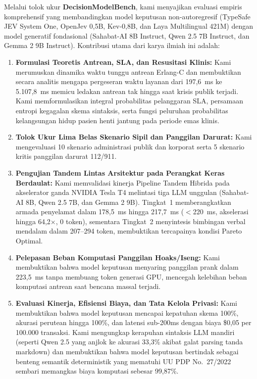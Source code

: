 \documentclass[journal,compsoc]{IEEEtran}
\begin{document}
Melalui tolok ukur \textbf{DecisionModelBench}, kami menyajikan evaluasi empiris komprehensif yang membandingkan model keputusan non-autoregresif (TypeSafe JEV System One, OpenJev 0,5B, Kev-0,8B, dan Laya Multilingual 421M) dengan model generatif fondasional (Sahabat-AI 8B Instruct, Qwen 2.5 7B Instruct, dan Gemma 2 9B Instruct). Kontribusi utama dari karya ilmiah ini adalah:
\begin{enumerate}
    \item \textbf{Formulasi Teoretis Antrean, SLA, dan Resusitasi Klinis:} Kami merumuskan dinamika waktu tunggu antrean Erlang-C dan membuktikan secara analitis mengapa pergeseran waktu layanan dari 197,6~ms ke 5.107,8~ms memicu ledakan antrean tak hingga saat krisis publik terjadi. Kami memformulasikan integral probabilitas pelanggaran SLA, persamaan entropi kegagalan skema sintaksis, serta fungsi peluruhan probabilitas kelangsungan hidup pasien henti jantung pada periode emas klinis.
    \item \textbf{Tolok Ukur Lima Belas Skenario Sipil dan Panggilan Darurat:} Kami mengevaluasi 10 skenario administrasi publik dan korporat serta 5 skenario kritis panggilan darurat 112/911.
    \item \textbf{Pengujian Tandem Lintas Arsitektur pada Perangkat Keras Berdaulat:} Kami memvalidasi kinerja Pipeline Tandem Hibrida pada akselerator ganda NVIDIA Tesla T4 melintasi tiga LLM unggulan (Sahabat-AI 8B, Qwen 2.5 7B, dan Gemma 2 9B). Tingkat~1 memberangkatkan armada penyelamat dalam 178,5~ms hingga 217,7~ms ($<$220~ms, akselerasi hingga 64,2$\times$, 0 token), sementara Tingkat~2 menyintesis bimbingan verbal mendalam dalam 207--294 token, membuktikan tercapainya kondisi Pareto Optimal.
    \item \textbf{Pelepasan Beban Komputasi Panggilan Hoaks/Iseng:} Kami membuktikan bahwa model keputusan menyaring panggilan prank dalam 223,5~ms tanpa membuang token generasi GPU, mencegah kelebihan beban komputasi antrean saat bencana massal terjadi.
    \item \textbf{Evaluasi Kinerja, Efisiensi Biaya, dan Tata Kelola Privasi:} Kami membuktikan bahwa model keputusan mencapai kepatuhan skema 100\%, akurasi perutean hingga 100\%, dan latensi sub-200ms dengan biaya \$0,05 per 100.000 transaksi. Kami mengungkap kerapuhan sintaksis LLM mandiri (seperti Qwen 2.5 yang anjlok ke akurasi 33,3\% akibat galat parsing tanda markdown) dan membuktikan bahwa model keputusan bertindak sebagai benteng semantik deterministik yang mematuhi UU PDP No.~27/2022 sembari memangkas biaya komputasi sebesar 99,87\%.
\end{enumerate}
\end{document}
